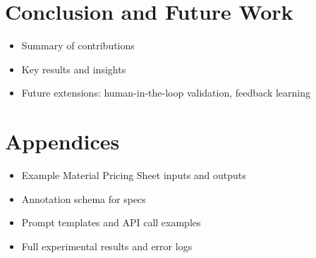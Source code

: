 \documentclass[11pt]{article}
\begin{document}
\section{Conclusion and Future Work}
\begin{itemize}
  \item Summary of contributions
  \item Key results and insights
  \item Future extensions: human-in-the-loop validation, feedback learning
\end{itemize}

\appendix
\section*{Appendices}
\begin{itemize}
  \item Example Material Pricing Sheet inputs and outputs
  \item Annotation schema for specs
  \item Prompt templates and API call examples
  \item Full experimental results and error logs
\end{itemize}
\end{document}
